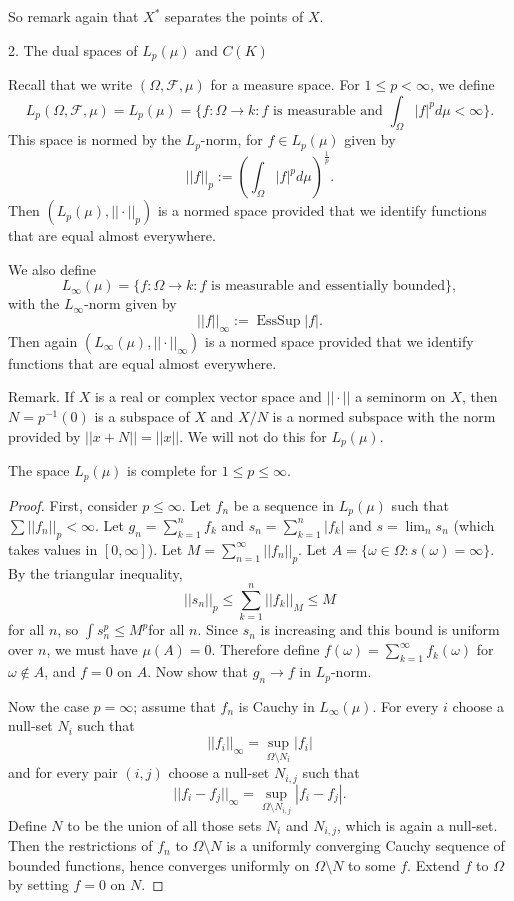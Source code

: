 So remark again that $X^*$ separates the points of $X$.






{\LARGE 2. The dual spaces of $L_p(\mu)$ and $C(K)$}

Recall that we write $(\Omega,\mathcal{F},\mu)$ for a measure space.
For $1\leq p<\infty$, we define
$$L_p(\Omega,\mathcal{F},\mu)=L_p(\mu)=\{f:\Omega\to k:\text{$f$ is measurable and $\int_\Omega |f|^pd\mu<\infty$}\}.$$
This space is normed by the $L_p$-norm,
for $f\in L_p(\mu)$ given by
$$||f||_p:=\left(\int_\Omega |f|^pd\mu\right)^{\frac{1}{p}}.$$
Then $(L_p(\mu),||\cdot ||_p)$ is a normed space provided that we identify functions that are equal almost everywhere.

We also define
$$L_\infty(\mu)=\{f:\Omega\to k:\text{$f$ is measurable and essentially bounded}\},$$
with the $L_\infty$-norm given by
$$||f||_{\infty}:=\operatorname{Ess Sup}|f|.$$
Then again $(L_\infty(\mu),||\cdot ||_\infty)$ is a normed space provided that we identify functions that are equal almost everywhere.

Remark. If $X$ is a real or complex vector space and $||\cdot ||$ a seminorm on $X$,
then $N=p^{-1}(0)$ is a subspace of $X$ and $X/N$ is a normed subspace with the norm provided by
$||x+N||=||x||$.
We will not do this for $L_p(\mu)$.

\begin{theorem}
The space $L_p(\mu)$ is complete for $1\leq p\leq \infty$.
\end{theorem}

\begin{proof}
First, consider $p\leq \infty$.
Let $f_n$ be a sequence in $L_p(\mu)$ such that $\sum ||f_n||_p<\infty$.
Let $g_n=\sum_{k=1}^n f_k$
and $s_n=\sum_{k=1}^n |f_k|$
and $s=\lim_{n}s_n$ (which takes values in $[0,\infty]$).
Let $M=\sum_{n=1}^\infty||f_n||_p$.
Let $A=\{\omega\in\Omega:s(\omega)=\infty\}$.
By the triangular inequality,
$$||s_n||_p\leq \sum_{k=1}^n||f_k||_M\leq M$$
for all $n$, so $\int s_n^p\leq M^p$for all $n$.
Since $s_n$ is increasing and this bound is uniform over $n$, we must have $\mu(A)=0$.
Therefore define
$f(\omega)=\sum_{k=1}^\infty f_k(\omega)$ for $\omega \not\in A$,
and $f=0$ on $A$.
Now show that $g_n\to f$ in $L_p$-norm.

Now the case $p=\infty$; assume that $f_n$ is Cauchy in $L_\infty(\mu)$.
For every $i$ choose a null-set $N_i$ such that
$$||f_i||_\infty=\sup_{\Omega\setminus N_i}|f_i|$$
and for every pair $(i,j)$ choose a null-set $N_{i,j}$ such that
$$||f_i-f_j||_\infty=\sup_{\Omega\setminus N_{i,j}}|f_i-f_j|.$$
Define $N$ to be the union of all those sets $N_i$ and $N_{i,j}$,
which is again a null-set.
Then the restrictions of $f_n$ to $\Omega\setminus N$
is a uniformly converging Cauchy sequence of bounded functions,
hence converges uniformly on $\Omega\setminus N$ to some $f$.
Extend $f$ to $\Omega$ by setting $f=0$ on $N$.
\end{proof}

